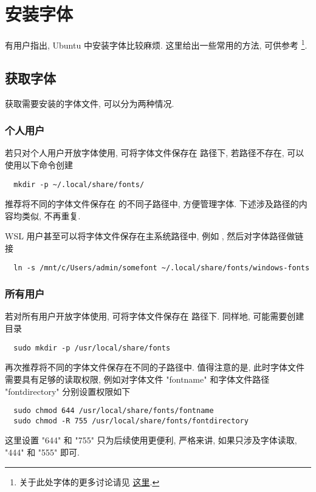\section{安装字体}\label{sec:addition:font}

有用户指出,
Ubuntu 中安装字体比较麻烦.
这里给出一些常用的方法,
可供参考%
\footnote{关于此处字体的更多讨论请见%
  \href{https://github.com/OsbertWang/install-latex-guide-zh-cn/issues/75}{这里}.}.

\subsection{获取字体}

获取需要安装的字体文件,
可以分为两种情况.

\subsubsection{个人用户}

若只对个人用户开放字体使用,
可将字体文件保存在  路径下,
若路径不存在,
可以使用以下命令创建
\begin{lstlisting}
  mkdir -p ~/.local/share/fonts/
\end{lstlisting}
推荐将不同的字体文件保存在  的不同子路径中,
方便管理字体.
下述涉及路径的内容均类似,
不再重复.

WSL 用户甚至可以将字体文件保存在主系统路径中,
例如 ,
然后对字体路径做链接
\begin{lstlisting}
  ln -s /mnt/c/Users/admin/somefont ~/.local/share/fonts/windows-fonts
\end{lstlisting}

\subsubsection{所有用户}

若对所有用户开放字体使用,
可将字体文件保存在  路径下.
同样地,
可能需要创建目录
\begin{lstlisting}
  sudo mkdir -p /usr/local/share/fonts
\end{lstlisting}
再次推荐将不同的字体文件保存在不同的子路径中.
值得注意的是,
此时字体文件需要具有足够的读取权限,
例如对字体文件 "fontname" 和字体文件路径 "fontdirectory" 分别设置权限如下
\begin{lstlisting}
  sudo chmod 644 /usr/local/share/fonts/fontname
  sudo chmod -R 755 /usr/local/share/fonts/fontdirectory
\end{lstlisting}
这里设置 "644" 和 "755" 只为后续使用更便利,
严格来讲,
如果只涉及字体读取,
"444" 和 "555" 即可.

